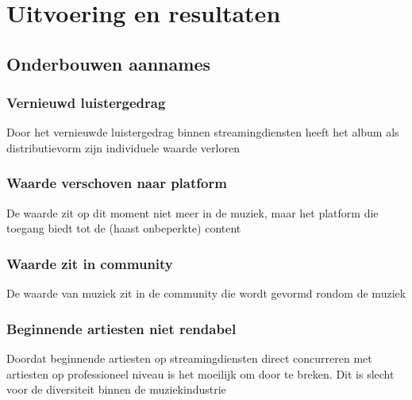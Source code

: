 \section{Uitvoering en resultaten}

\subsection{Onderbouwen aannames}

\subsubsection{Vernieuwd luistergedrag}

\begin{quotebox}
Door het vernieuwde luistergedrag binnen streamingdiensten heeft het album als distributievorm zijn individuele waarde verloren
\end{quotebox}

\subsubsection{Waarde verschoven naar platform}
\begin{quotebox}
De waarde zit op dit moment niet meer in de muziek, maar het platform die toegang biedt tot de (haast onbeperkte) content
\end{quotebox}

\subsubsection{Waarde zit in community}
\begin{quotebox}
De waarde van muziek zit in de community die wordt gevormd rondom de muziek
\end{quotebox}

\subsubsection{Beginnende artiesten niet rendabel}
\begin{quotebox}
Doordat beginnende artiesten op streamingdiensten direct concurreren met artiesten op professioneel niveau is het moeilijk om door te breken. Dit is slecht voor de diversiteit binnen de muziekindustrie
\end{quotebox}

